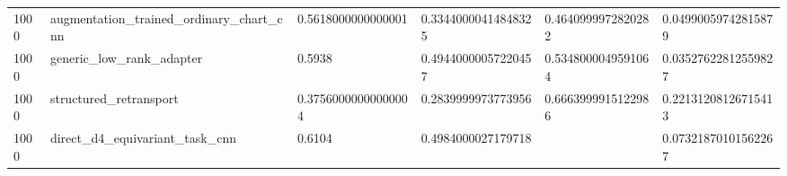 \begin{table}[t]
\begin{tabular}{llllll}
1000 & augmentation\_trained\_ordinary\_chart\_cnn & 0.5618000000000001 & 0.33440000414848325 & 0.4640999972820282 & 0.04990059742815879 \\
1000 & generic\_low\_rank\_adapter & 0.5938 & 0.49440000057220457 & 0.5348000049591064 & 0.03527622812559827 \\
1000 & structured\_retransport & 0.37560000000000004 & 0.2839999973773956 & 0.6663999915122986 & 0.22131208126715413 \\
1000 & direct\_d4\_equivariant\_task\_cnn & 0.6104 & 0.4984000027179718 &  & 0.07321870101562267 \\
\bottomrule
\end{tabular}
\end{table}
